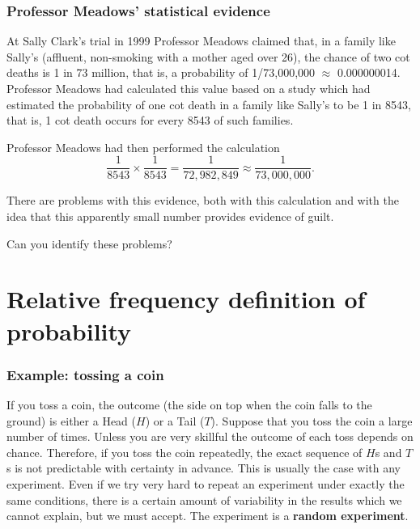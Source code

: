 \documentclass[
  british,
]{book}
\begin{document}
\hypertarget{professor-meadows-statistical-evidence}{%
\subsubsection*{Professor Meadows' statistical evidence}\label{professor-meadows-statistical-evidence}}

At Sally Clark's trial in 1999 Professor Meadows claimed that, in a family like Sally's (affluent, non-smoking with a mother aged over 26), the chance of two cot deaths is 1 in 73 million, that is, a probability of 1/73,000,000 \(\approx\) 0.000000014. Professor Meadows had calculated this value based on a study which had estimated the probability of one cot death in a family like Sally's to be 1 in 8543, that is, 1 cot death occurs for every 8543 of such families.

Professor Meadows had then performed the calculation
\[\frac{1}{8543}\times\frac{1}{8543}=\frac{1}{72,982,849}\approx\frac{1}{73,000,000}.\]

There are problems with this evidence, both with this calculation and with the idea that this apparently small number provides evidence of guilt.

Can you identify these problems?

\hypertarget{relative-frequency-definition-of-probability}{%
\section{Relative frequency definition of probability}\label{relative-frequency-definition-of-probability}}

\hypertarget{example-tossing-a-coin}{%
\subsubsection*{Example: tossing a coin}\label{example-tossing-a-coin}}

If you toss a coin, the outcome (the side on top when the coin falls to the ground) is either a Head (\(H\)) or a Tail (\(T\)). Suppose that you toss the coin a large number of times. Unless you are very skillful the outcome of each toss depends on chance. Therefore, if you toss the coin repeatedly, the exact sequence of \(H\)s and \(T\)s is not predictable with certainty in advance. This is usually the case with any experiment. Even if we try very hard to repeat an experiment under exactly the same conditions, there is a certain amount of variability in the results which we cannot explain, but we must accept. The experiment is a
\textbf{random experiment}.
\end{document}
